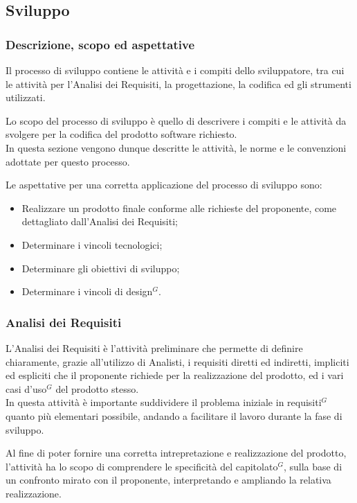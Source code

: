 \subsection{Sviluppo}

\subsubsection{Descrizione, scopo ed aspettative}

Il processo di sviluppo contiene le attività e i compiti dello sviluppatore, tra cui le attività per l’Analisi dei Requisiti, la progettazione, la codifica ed gli strumenti utilizzati.

Lo scopo del processo di sviluppo è quello di descrivere i compiti e le attività da svolgere per la codifica del prodotto software richiesto. \\
In questa sezione vengono dunque descritte le attività, le norme e le convenzioni adottate per questo processo.

Le aspettative per una corretta applicazione del processo di sviluppo sono:
\begin{itemize}
    \item Realizzare un prodotto finale conforme alle richieste del proponente, come dettagliato dall'Analisi dei Requisiti;
    \item Determinare i vincoli tecnologici;
    \item Determinare gli obiettivi di sviluppo;
    \item Determinare i vincoli di design$^{G}$.
\end{itemize}
\subsubsection{Analisi dei Requisiti}


L’Analisi dei Requisiti è l’attività preliminare che permette di definire chiaramente, grazie all'utilizzo di Analisti, i requisiti diretti ed indiretti,
impliciti ed espliciti che il proponente richiede per la realizzazione del prodotto, ed i vari casi d’uso$^{G}$ del prodotto stesso. \\
In questa attività è importante suddividere il problema iniziale in requisiti$^{G}$ quanto più elementari possibile, andando a facilitare il lavoro durante la fase di sviluppo.

Al fine di poter fornire una corretta intrepretazione e realizzazione del prodotto, l'attività ha lo scopo di comprendere le specificità del capitolato$^{G}$, sulla base di un confronto mirato con il proponente, interpretando e ampliando la relativa realizzazione.
\pagebreak

